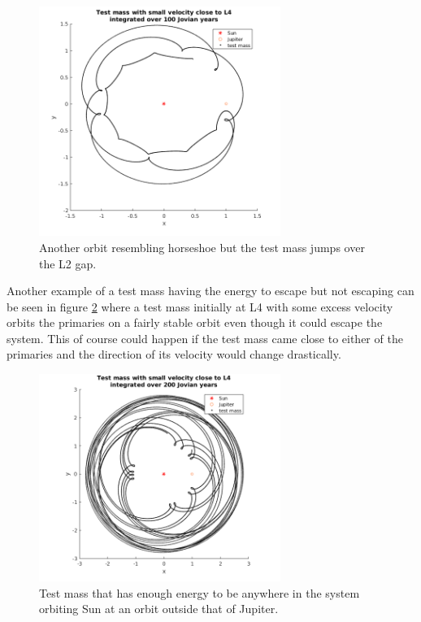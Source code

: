 \documentclass[12pt,a4paper,titlepage]{article}
\begin{document}
\begin{figure}
\centering
\includegraphics[width=0.7\textwidth]{../plots/L4-horsie.png}
\caption{Another orbit resembling horseshoe but the test mass jumps over the L2 gap.}
\label{L4-horsie1}
\end{figure}

Another example of a test mass having the energy to escape but not escaping can be seen in figure \ref{L4-morevel} where a test mass initially at L4 with some excess velocity orbits the primaries on a fairly stable orbit even though it could escape the system. This of course could happen if the test mass came close to either of the primaries and the direction of its velocity would change drastically.

\begin{figure}
\centering
\includegraphics[width=0.7\textwidth]{../plots/L4-morevel.png}
\caption{Test mass that has enough energy to be anywhere in the system orbiting Sun at an orbit outside that of Jupiter.}
\label{L4-morevel}
\end{figure}
\end{document}
